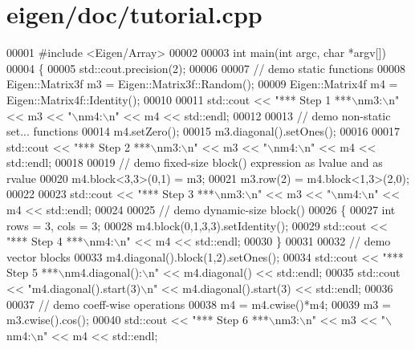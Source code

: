 \hypertarget{eigen_2doc_2tutorial_8cpp_source}{}\section{eigen/doc/tutorial.cpp}
\label{eigen_2doc_2tutorial_8cpp_source}

\begin{DoxyCode}
00001 \textcolor{preprocessor}{#include <Eigen/Array>}
00002 
00003 \textcolor{keywordtype}{int} main(\textcolor{keywordtype}{int} argc, \textcolor{keywordtype}{char} *argv[])
00004 \{
00005   std::cout.precision(2);
00006 
00007   \textcolor{comment}{// demo static functions}
00008   Eigen::Matrix3f m3 = Eigen::Matrix3f::Random();
00009   Eigen::Matrix4f m4 = Eigen::Matrix4f::Identity();
00010 
00011   std::cout << \textcolor{stringliteral}{"*** Step 1 ***\(\backslash\)nm3:\(\backslash\)n"} << m3 << \textcolor{stringliteral}{"\(\backslash\)nm4:\(\backslash\)n"} << m4 << std::endl;
00012 
00013   \textcolor{comment}{// demo non-static set... functions}
00014   m4.setZero();
00015   m3.diagonal().setOnes();
00016   
00017   std::cout << \textcolor{stringliteral}{"*** Step 2 ***\(\backslash\)nm3:\(\backslash\)n"} << m3 << \textcolor{stringliteral}{"\(\backslash\)nm4:\(\backslash\)n"} << m4 << std::endl;
00018 
00019   \textcolor{comment}{// demo fixed-size block() expression as lvalue and as rvalue}
00020   m4.block<3,3>(0,1) = m3;
00021   m3.row(2) = m4.block<1,3>(2,0);
00022 
00023   std::cout << \textcolor{stringliteral}{"*** Step 3 ***\(\backslash\)nm3:\(\backslash\)n"} << m3 << \textcolor{stringliteral}{"\(\backslash\)nm4:\(\backslash\)n"} << m4 << std::endl;
00024 
00025   \textcolor{comment}{// demo dynamic-size block()}
00026   \{
00027     \textcolor{keywordtype}{int} rows = 3, cols = 3;
00028     m4.block(0,1,3,3).setIdentity();
00029     std::cout << \textcolor{stringliteral}{"*** Step 4 ***\(\backslash\)nm4:\(\backslash\)n"} << m4 << std::endl;
00030   \}
00031 
00032   \textcolor{comment}{// demo vector blocks}
00033   m4.diagonal().block(1,2).setOnes();
00034   std::cout << \textcolor{stringliteral}{"*** Step 5 ***\(\backslash\)nm4.diagonal():\(\backslash\)n"} << m4.diagonal() << std::endl;
00035   std::cout << \textcolor{stringliteral}{"m4.diagonal().start(3)\(\backslash\)n"} << m4.diagonal().start(3) << std::endl;
00036 
00037   \textcolor{comment}{// demo coeff-wise operations}
00038   m4 = m4.cwise()*m4;
00039   m3 = m3.cwise().cos();
00040   std::cout << \textcolor{stringliteral}{"*** Step 6 ***\(\backslash\)nm3:\(\backslash\)n"} << m3 << \textcolor{stringliteral}{"\(\backslash\)nm4:\(\backslash\)n"} << m4 << std::endl;

\end{DoxyCode}
